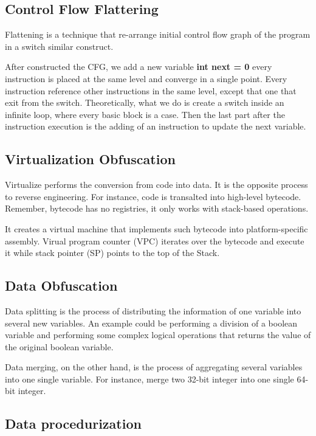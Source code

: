 \subsection{Control Flow Flattering}

Flattening is a technique that re-arrange initial control flow graph of the program in a switch similar construct.
\par 
After constructed the CFG, we add a new variable \textbf{int next = 0}
every instruction is placed at the same level and converge in a single point. Every instruction reference other instructions in the same level, except that one that exit from the switch. Theoretically, what we do is create a switch inside an infinite loop, where every basic block is a case. Then the last part after the instruction execution is the adding of an instruction to update the next variable. 

\subsection{Virtualization Obfuscation}

Virtualize performs the conversion from code into data. 
It is the opposite process to reverse engineering. For instance, code is transalted into high-level bytecode. Remember, bytecode has no registries, it only works with stack-based operations. 
\par
It creates a virtual machine that implements such bytecode into platform-specific assembly. 
Virual program counter (VPC) iterates over the bytecode and execute it while stack pointer (SP) points to the top of the Stack. 

\subsection{Data Obfuscation}

Data splitting is the process of distributing the information of one variable into several new variables. An example could be performing a division of a boolean variable and performing some complex logical operations that returns the value of the original boolean variable. 
\par
Data merging, on the other hand, is the process of aggregating several variables into one single variable. For instance, merge two 32-bit integer into one single 64-bit integer. 

\subsection{Data procedurization}

